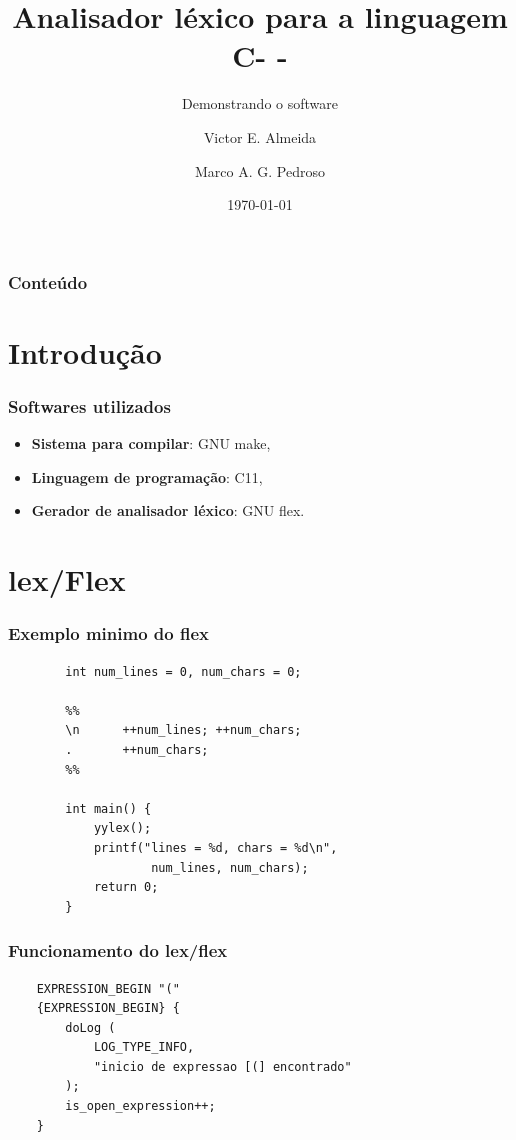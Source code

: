 \documentclass[12pt]{beamer}
\author[Grupo: c--]{Victor E. Almeida \and Marco A. G. Pedroso}
\title{Analisador léxico para a linguagem C- -}
\subtitle{Demonstrando o software}
\date{\today}
\institute{UNIOESTE}
\begin{document}
\frame{\titlepage}

\begin{frame}
\frametitle{Conteúdo}
\tableofcontents
\end{frame}

\section{Introdução}\label{Introdução}
\begin{frame}
    \frametitle{Softwares utilizados}
    \begin{itemize}
        \item \textbf{Sistema para compilar}: GNU make,
        \item \textbf{Linguagem de programação}: C11,
        \item \textbf{Gerador de analisador léxico}: GNU flex.
    \end{itemize}
\end{frame}

\section{lex/Flex}\label{lex/Flex}

\begin{frame}[t,fragile]{\insertsectionhead}
    \frametitle{Exemplo minimo do flex}
    \begin{lstlisting}
        int num_lines = 0, num_chars = 0;

        %%
        \n      ++num_lines; ++num_chars;
        .       ++num_chars;
        %%

        int main() {
            yylex();
            printf("lines = %d, chars = %d\n",
                    num_lines, num_chars);
            return 0;
        }
    \end{lstlisting}
\end{frame}

\begin{frame}[t,fragile]{\insertsectionhead}
    \frametitle{Funcionamento do lex/flex}

    \begin{center}
        
    \begin{lstlisting}
    EXPRESSION_BEGIN "("
    {EXPRESSION_BEGIN} {
        doLog (
            LOG_TYPE_INFO,
            "inicio de expressao [(] encontrado"
        );
        is_open_expression++;
    }
    \end{lstlisting}
    \end{center}
    
\end{frame}
\end{document}
